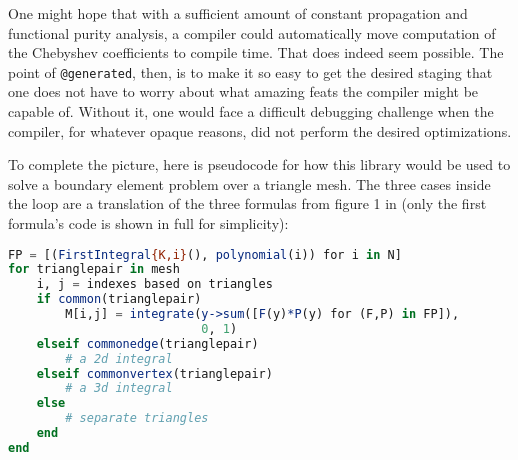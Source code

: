 One might hope that with a sufficient amount of constant propagation and
functional purity analysis, a compiler could automatically move
computation of the Chebyshev coefficients to compile time.
That does indeed seem possible.
The point of \texttt{@generated}, then, is to make it so easy to
get the desired staging that one does not have to worry
about what amazing feats the compiler might be capable of.
Without it, one would face a difficult debugging challenge when the
compiler, for whatever opaque reasons, did not perform the desired
optimizations.

To complete the picture, here is pseudocode for how this library would be
used to solve a boundary element problem over a triangle mesh.
The three cases inside the loop are a translation of the three formulas
from figure 1 in \cite{ReidWhJo14} (only the first formula's code is shown in
full for simplicity):

\begin{singlespace}
\begin{lstlisting}[language=julia]
FP = [(FirstIntegral{K,i}(), polynomial(i)) for i in N]
for trianglepair in mesh
    i, j = indexes based on triangles
    if common(trianglepair)
        M[i,j] = integrate(y->sum([F(y)*P(y) for (F,P) in FP]),
                           0, 1)
    elseif commonedge(trianglepair)
        # a 2d integral
    elseif commonvertex(trianglepair)
        # a 3d integral
    else
        # separate triangles
    end
end
\end{lstlisting}
\end{singlespace}






